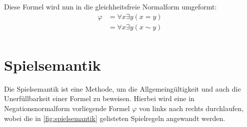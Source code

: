 				Diese Formel wird nun in die gleichheitsfreie Normalform umgeformt:
				\begin{align*}
					\varphi & = \forall x \exists y (x = y) \tag{Substitution}                   \\
					        & = \forall x \exists y (x \sim y) \tag{Gleichheitsfreie Normalform} \\
				\end{align*}

	\section{Spielsemantik}
		Die Spielsemantik ist eine Methode, um die Allgemeingültigkeit und auch die Unerfüllbarkeit einer Formel zu beweisen. Hierbei wird eine in Negationsnormalform vorliegende Formel $ \varphi $ von links nach rechts durchlaufen, wobei die in \ref{fig:spielsemantik} gelisteten Spielregeln angewandt werden.

